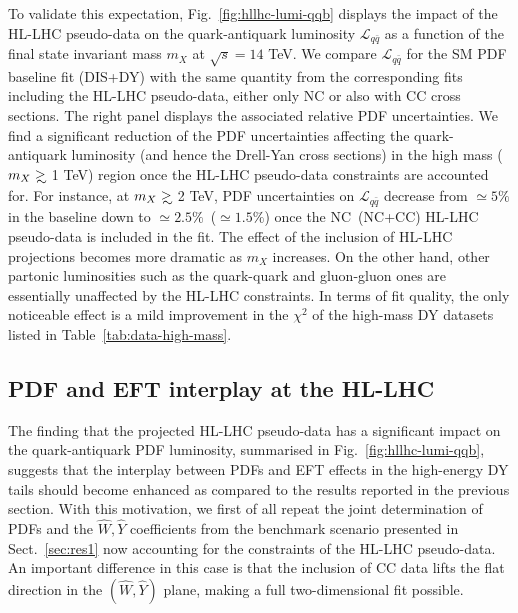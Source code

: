 \documentclass[withindex,glossary]{cam-thesis}
\def\gsim{\mathrel{\rlap{\lower4pt\hbox{\hskip1pt$\sim$}}
    \raise1pt\hbox{$>$}}}
\begin{document}
To validate this expectation, Fig.~\ref{fig:hllhc-lumi-qqb} displays
the impact of the
HL-LHC pseudo-data on the quark-antiquark luminosity $\mathcal{L}_{q\bar{q}}$
as a function
of the final state invariant mass $m_X$ at $\sqrt{s}=14$ TeV.
%
We compare  $\mathcal{L}_{q\bar{q}}$ for the SM PDF baseline fit (DIS+DY)
with the same quantity from the corresponding fits including the HL-LHC pseudo-data, either only NC
or also with CC cross sections.
%
The right panel displays the associated relative PDF uncertainties.
We find a significant reduction of the PDF uncertainties
affecting the quark-antiquark luminosity (and hence the Drell-Yan
cross sections) in the high mass ($m_X\gsim$ 1 TeV) region
once the HL-LHC pseudo-data constraints are accounted for.
%
For instance, at  $m_X\gsim$ 2 TeV, PDF uncertainties on $\mathcal{L}_{q\bar{q}}$
decrease from $\simeq5\%$ in the baseline down to $\simeq 2.5\%$~($\simeq 1.5\%$)
once the NC~(NC+CC) HL-LHC pseudo-data is included in the fit. The
effect of the inclusion of HL-LHC projections becomes more dramatic as
$m_X$ increases. 
%
On the other hand, other partonic luminosities such as the quark-quark
and gluon-gluon ones are essentially unaffected by the HL-LHC constraints.
%
In terms of fit quality, the only noticeable effect is a mild
improvement in the $\chi^2$ of the high-mass DY datasets listed in
Table~\ref{tab:data-high-mass}. 

\subsection{PDF and EFT interplay at the HL-LHC}
\label{sec:hllhc_joint_fits}

The finding  that the projected HL-LHC pseudo-data has a significant
impact on the quark-antiquark PDF luminosity, summarised in  Fig.~\ref{fig:hllhc-lumi-qqb}, 
 suggests that
the interplay between PDFs and EFT effects in the high-energy
DY tails should become enhanced
as compared to the results reported in the previous section.
%
With this motivation, we first of all repeat the joint
determination of PDFs and the $\hat{W},\hat{Y}$ coefficients
from the benchmark scenario presented in Sect.~\ref{sec:res1}
now accounting for the constraints of the HL-LHC pseudo-data.
%
An important difference in this case is that the
inclusion of CC data lifts the flat direction in the $(\hat{W},\hat{Y})$
plane, making a full two-dimensional fit possible.\\
\end{document}
